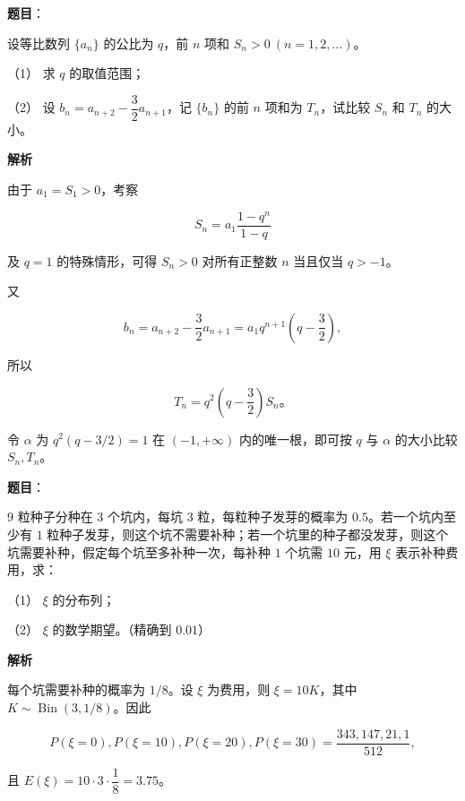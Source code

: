 \begin{answer}

\textbf{题目}：

设等比数列 $\{a_n\}$ 的公比为 $q$，前 $n$ 项和 $S_n>0\ (n=1,2,\ldots)$。

（1） 求 $q$ 的取值范围；

（2） 设 $b_n=a_{n+2}-\dfrac32a_{n+1}$，记 $\{b_n\}$ 的前 $n$ 项和为 $T_n$，试比较 $S_n$ 和 $T_n$ 的大小。

\textbf{解析}


由于 $a_1=S_1>0$，考察

\nopagebreak[4]
\[
S_n=a_1\frac{1-q^n}{1-q}
\]

及 $q=1$ 的特殊情形，可得 $S_n>0$ 对所有正整数 $n$ 当且仅当 $q>-1$。


又

\nopagebreak[4]
\[
b_n=a_{n+2}-\frac32a_{n+1}
=a_1q^{n+1}\left(q-\frac32\right),
\]

所以

\nopagebreak[4]
\[
T_n=q^2\left(q-\frac32\right)S_n\text{。}
\]

令 $\alpha$ 为 $q^2(q-3/2)=1$ 在 $(-1,+\infty)$ 内的唯一根，即可按 $q$ 与 $\alpha$ 的大小比较 $S_n,T_n$。



\end{answer}
\begin{answer}

\textbf{题目}：

$9$ 粒种子分种在 $3$ 个坑内，每坑 $3$ 粒，每粒种子发芽的概率为 $0.5$。若一个坑内至少有 $1$ 粒种子发芽，则这个坑不需要补种；若一个坑里的种子都没发芽，则这个坑需要补种，假定每个坑至多补种一次，每补种 $1$ 个坑需 $10$ 元，用 $\xi$ 表示补种费用，求：

（1） $\xi$ 的分布列；

（2） $\xi$ 的数学期望。（精确到 $0.01$）

\textbf{解析}


每个坑需要补种的概率为 $1/8$。设 $\xi$ 为费用，则 $\xi=10K$，其中 $K\sim\operatorname{Bin}(3,1/8)$。因此

\nopagebreak[4]
\[
P(\xi=0),P(\xi=10),P(\xi=20),P(\xi=30)
=\frac{343,147,21,1}{512},
\]


且 $E(\xi)=10\cdot3\cdot\dfrac18=3.75$。



\end{answer}
